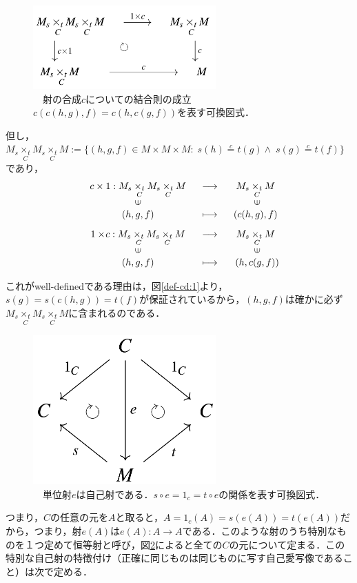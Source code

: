 \documentclass[uplatex, 12pt, a4paper, dvipdfmx]{jsarticle}
\begin{document}
\begin{figure}[ht] \begin{center}  \caption{\label{def-cd:2}　射の合成$c$についての結合則の成立$c(c(h,g),f)=c(h,c(g,f))$を表す可換図式．}
    \includegraphics[width=7cm]{cd-2.png}
\end{center}\end{figure}
但し，$M_s \underset{C}{\times_t}M_s \underset{C}{\times_t}M := \{ (h,g,f)\in M\times M\times M : \; s(h)\overset{c}{=} t(g) \wedge \; s(g) \overset{c}{=} t(f) \}$であり，$$\begin{array}{ccc}
        c\times1:M_s\underset{C}{\times_t}M_s\underset{C}{\times_t}M & \longrightarrow & M_s\underset{C}{\times_t}M \\
        \rotatebox{90}{$\in$} & & \rotatebox{90}{$\in$}\\
        (h,g,f) & \longmapsto & (c(h,g),f) \\[3mm]
        1\times \! c:M_s\underset{C}{\times_t}M_s\underset{C}{\times_t}M & \longrightarrow & M_s\underset{C}{\times_t}M \\
        \rotatebox{90}{$\in$} & & \rotatebox{90}{$\in$}\\
        (h,g,f) & \longmapsto & (h,c(g,f))
\end{array}$$

これがwell-definedである理由は，図\ref{def-cd:1}より，$s(g)=s(c(h,g))=t(f)$が保証されているから，$(h,g,f)$は確かに必ず$M_s \underset{C}{\times_t}M_s \underset{C}{\times_t}M$に含まれるのである．\\[3cm]

\begin{figure}[ht] \begin{center}  \caption{\label{def-cd:3}　単位射$e$は自己射である．$s\circ e=1_c=t\circ e$の関係を表す可換図式．}
    \includegraphics[width=7cm]{cd-3.png}
\end{center}\end{figure}
つまり，$C$の任意の元を$A$と取ると，$A=1_c(A)=s(e(A))=t(e(A))$だから，つまり，射$e(A)$は$e(A):A\longrightarrow A$である．このような射のうち特別なものを１つ定めて恒等射と呼び，図\ref{def-cd:3}によると全ての$C$の元について定まる．この特別な自己射の特徴付け（正確に同じものは同じものに写す自己愛写像であること）は次で定める．
\end{document}
